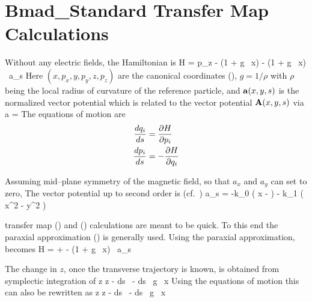 \documentclass{book}
\begin{document}
\setlength{\parskip}{\dPar}
\setlength{\parindent}{0ex}

\newcommand{\bfr}{{\bf r}}
\newcommand{\bfM}{{\bf M}}
\newcommand{\bfK}{{\bf K}}

\section{Bmad\_Standard Transfer Map Calculations}
\label{s:bmad_standard}

Without any electric fields, the Hamiltonian is
\Begineq
  H = p_z - (1 + g \, x)  - 
  (1 + g \, x) \, a_s
  \label{h1gx1}
\Endeq
Here $(x, p_x, y, p_y, z, p_z)$ are the canonical coordinates
(), $g = 1/\rho$ with $\rho$ being the
local radius of curvature of the reference particle, and
${\bf a}(x,y,s)$ is the normalized vector potential which is related to
the vector potential ${\bf A}(x,y,s)$ via
\Begineq
  \Bf a = 
\Endeq
The equations of motion are
\begin{align}
  \frac{dq_i}{ds} &= \frac{\partial H}{\partial p_i} \nonumber \\
  \frac{dp_i}{ds} &= -\frac{\partial H}{\partial q_i}
  \label{rshp}
\end{align}

Assuming mid--plane symmetry of the magnetic field, so
that $a_x$ and $a_y$ can set to zero\cite{b:madphysics}, The vector
potential up to second order is (cf.~)
\Begineq
  a_s = -k_0 \left( x -  \right) -
   k_1 \left( x^2 - y^2 \right)
\Endeq

 transfer map () and ()
calculations are meant to be quick. To this end the paraxial
approximation () is generally used.  Using the paraxial
approximation,  becomes
\Begineq
  H =  +  - 
  (1 + g \, x) \, a_s 
  \label{hpapa}
\Endeq

The change in $z$, once the transverse trajectory is
known, is obtained from symplectic integration of  
\Begineq
  z \rightarrow z -  \int \! ds \, 
  \left[ (p_x - a_x)^2 + (p_y - a_y)^2 \right] - \int \! ds \, g \, x
  \label{zz121p}
\Endeq
Using the equations of motion  this can also be rewritten as
\Begineq
  z \rightarrow z -  \int \! ds \, 
   - 
  \int \! ds \, g \, x
  \label{zz12sx}
\Endeq
\end{document}
